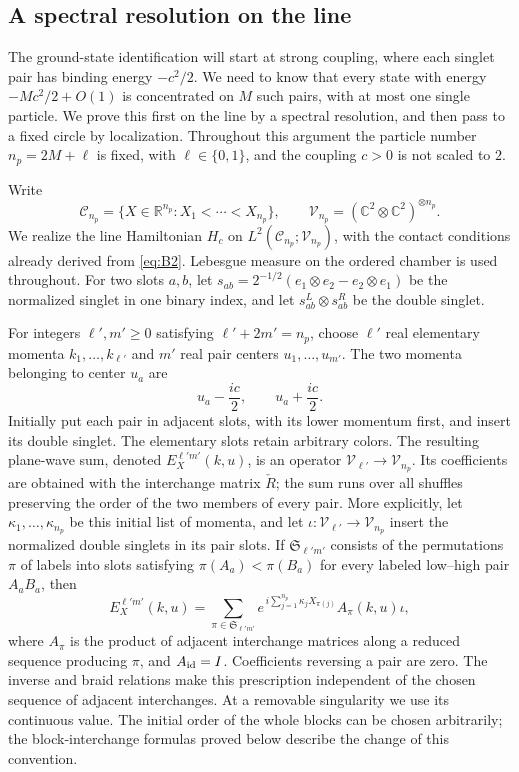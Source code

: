\subsection{A spectral resolution on the line}
\label{subsec:bethe-line}

The ground-state identification will start at strong coupling, where each
singlet pair has binding energy \(-c^2/2\).  We need to know that every
state with energy \(-Mc^2/2+O(1)\) is concentrated on \(M\) such pairs,
with at most one single particle.  We prove this first on the line by a
spectral resolution, and then pass to a fixed circle by localization.
Throughout this argument the particle number \(n_p=2M+\ell\) is fixed,
with \(\ell\in\{0,1\}\), and the coupling \(c>0\) is not scaled to \(2\).

Write
\[
 \mathcal C_{n_p}=\{X\in\mathbb R^{n_p}:X_1<\cdots<X_{n_p}\},
 \qquad
 \mathcal V_{n_p}=(\mathbb C^2\otimes\mathbb C^2)^{\otimes n_p}.
\]
We realize the line Hamiltonian \(H_c\) on
\(L^2(\mathcal C_{n_p};\mathcal V_{n_p})\), with the contact conditions
already derived from \eqref{eq:B2}.  Lebesgue measure on the ordered
chamber is used throughout.  For two slots \(a,b\), let
\(s_{ab}=2^{-1/2}(e_1\otimes e_2-e_2\otimes e_1)\) be the normalized
singlet in one binary index, and let
\(s_{ab}^{L}\otimes s_{ab}^{R}\) be the double singlet.

For integers \(\ell',m'\geq0\) satisfying \(\ell'+2m'=n_p\), choose
\(\ell'\) real elementary momenta \(k_1,\ldots,k_{\ell'}\) and \(m'\)
real pair centers \(u_1,\ldots,u_{m'}\).  The two momenta belonging to
center \(u_a\) are
\[
                 u_a-\frac{ic}{2},\qquad u_a+\frac{ic}{2}.
\]
Initially put each pair in adjacent slots, with its lower momentum
first, and insert its double singlet.  The elementary slots retain
arbitrary colors.  The resulting plane-wave sum, denoted
\(E_X^{\ell'm'}(k,u)\), is an operator
\(\mathcal V_{\ell'}\to\mathcal V_{n_p}\).  Its coefficients are obtained
with the interchange matrix \(\check R\); the sum runs over all
shuffles preserving the order of the two members of every pair.
More explicitly, let \(\kappa_1,\ldots,\kappa_{n_p}\) be this initial
list of momenta, and let \(\iota:\mathcal V_{\ell'}\to\mathcal V_{n_p}\)
insert the normalized double singlets in its pair slots.
If \(\mathfrak S_{\ell'm'}\) consists of the permutations \(\pi\)
of labels into slots satisfying
\(\pi(A_a)<\pi(B_a)\) for every labeled low--high pair \(A_aB_a\),
then
\[
 E_X^{\ell'm'}(k,u)
   =\sum_{\pi\in\mathfrak S_{\ell'm'}}
       e^{\,i\sum_{j=1}^{n_p}\kappa_jX_{\pi(j)}}A_\pi(k,u)\iota,
\]
where \(A_\pi\) is the product of adjacent interchange matrices
along a reduced sequence producing \(\pi\), and \(A_{\rm id}=I\).
Coefficients reversing a pair are zero.  The inverse and braid
relations make this prescription independent of the chosen sequence
of adjacent interchanges.  At a removable singularity we use its
continuous value.  The initial order of the whole blocks can be chosen
arbitrarily; the block-interchange formulas proved below describe the
change of this convention.


